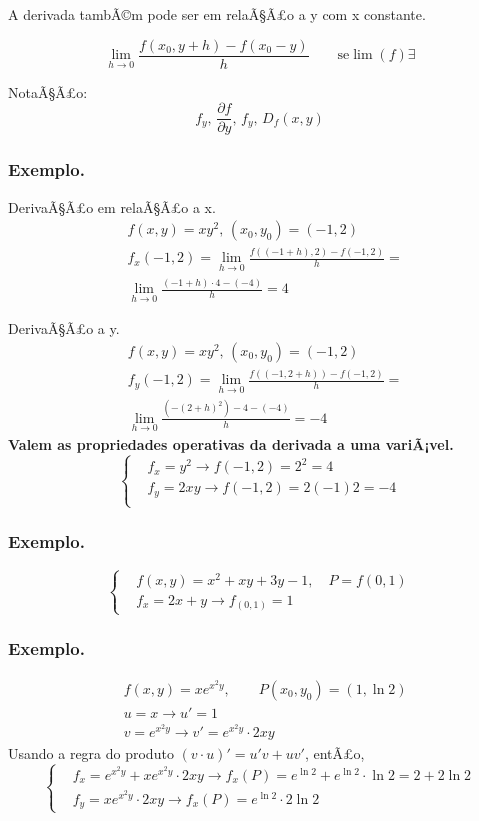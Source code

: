 A derivada tambÃ©m pode ser em relaÃ§Ã£o a y com x constante.

\[ \lim_{h\to0}\frac{f(x_0, y+h)-f(x_0-y)}{h}\qquad \text{se}
\lim(f)\exists\]

NotaÃ§Ã£o:
\[ f_y,\,\frac{\partial f}{\partial y},\,f_y,\,D_f(x,y) \]

\subsubsection{\textbf{Exemplo.}}%

DerivaÃ§Ã£o em relaÃ§Ã£o a x.
\begin{align*}
  &f(x,y)=xy^2,\,(x_0,y_0)=(-1,2)\\
  &f_x(-1,2)= \lim_{h\to0}\frac{f((-1+h),2)-f(-1,2)}{h}=\\
  &\lim_{h\to 0}\frac{(-1+h)\cdot 4-(-4)}{h}=4 
\end{align*}

DerivaÃ§Ã£o a y.
\begin{align*}
  &f(x,y)=xy^2,\,(x_0,y_0)=(-1,2)\\
  &f_y(-1,2)= \lim_{h\to0}\frac{f((-1,2+h))-f(-1,2)}{h}=\\
  &\lim_{h\to 0}\frac{(-(2+h)^2)- 4-(-4)}{h}=-4 
\end{align*}
\textbf{Valem as propriedades operativas da derivada a uma variÃ¡vel.}
\[\begin{cases}
  &f_x=y^2\to f(-1,2)=2^2=4\\
  &f_y=2xy\to f(-1,2)=2(-1)2=-4 \\
\end{cases}\]
\subsubsection{\textbf{Exemplo.}}
\[\begin{cases}
  &f(x,y)=x^2+xy+3y-1,\quad P=f(0,1)\\
  &f_x=2x+y\to f_(0,1)=1
\end{cases}\]
\subsubsection{\textbf{Exemplo.}}
\begin{align*}
  &f(x,y)=xe^{x^2y},\qquad P(x_0,y_0)=(1,\ln2)\\
  &u=x\to u'=1\\
  &v=e^{x^2y}\to v'=e^{x^2y}\cdot2xy
\end{align*}
Usando a regra do produto $(v\cdot u)'=u'v+uv'$, entÃ£o,
\[\begin{cases}
  &f_x= e^{x^2y}+xe^{x^2y}\cdot2xy\to f_x(P)=e^{\ln2}+e^{\ln2}\cdot\ln2=2+2\ln2\\
  &f_y= xe^{x^2y}\cdot2xy\to f_x(P)=e^{\ln2}\cdot2\ln2
\end{cases}\]
